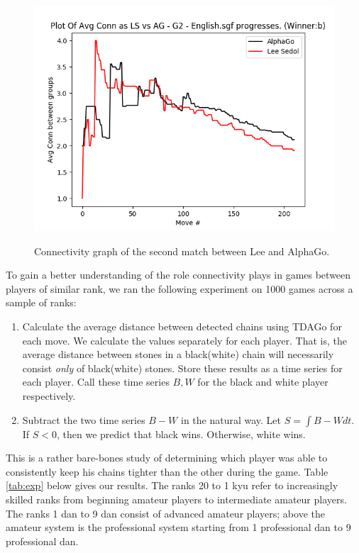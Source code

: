 \documentclass[11pt]{article}
\begin{document}
\begin{figure}[ht]
  \centering
  \includegraphics[scale=0.5]{lsdconn1.png}
  \label{fig:lsdconn1}
  \caption{Connectivity graph of the second match between Lee and AlphaGo.}
\end{figure}

To gain a better understanding of the role connectivity plays in games between players of similar rank, we ran the following experiment on 1000 games across a sample of ranks:

\begin{enumerate}
  \item Calculate the average distance between detected chains using TDAGo for each move. We calculate the values separately for each player. That is, the average distance between stones in a black(white) chain will necessarily consist \textit{only} of black(white) stones. Store these results as a time series for each player. Call these time series $B,W$ for the black and white player respectively.
  \item Subtract the two time series $B-W$ in the natural way. Let $S = \int B-W dt$. If $S < 0$, then we predict that black wins. Otherwise, white wins.
\end{enumerate}

This is a rather bare-bones study of determining which player was able to consistently keep his chains tighter than the other during the game. Table \ref{tab:exp} below gives our results. The ranks 20 to 1 kyu refer to increasingly skilled ranks from beginning amateur players to intermediate amateur players. The ranks 1 dan to 9 dan consist of advanced amateur players; above the amateur system is the professional system starting from 1 professional dan to 9 professional dan.
\end{document}

